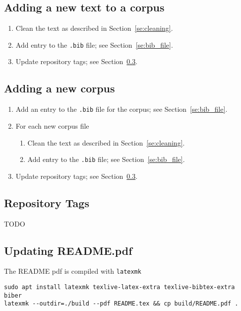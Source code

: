 \documentclass[a4paper,10pt]{paper}
\begin{document}
\subsection{Adding a new text to a corpus} \label{se:add_file}
\begin{enumerate}
    \item Clean the text as described in Section~\ref{se:cleaning}.
    \item Add entry to the \texttt{.bib} file; see Section~\ref{se:bib_file}. 
    \item Update repository tags; see Section~\ref{se:tags}.
\end{enumerate}

\subsection{Adding a new corpus}
\begin{enumerate}
    \item Add an entry to the \texttt{.bib} file for the corpus; see Section~\ref{se:bib_file}.
    \item For each new corpus file
        \begin{enumerate}
            \item Clean the text as described in Section~\ref{se:cleaning}.
            \item Add entry to the \texttt{.bib} file; see Section~\ref{se:bib_file}. 
        \end{enumerate}
    \item Update repository tags; see Section~\ref{se:tags}.
\end{enumerate}
\subsection{Repository Tags} \label{se:tags}
TODO

\subsection{Updating README.pdf} \label{se:update_readme}
The README pdf is compiled with \texttt{latexmk}
\begin{verbatim}
sudo apt install latexmk texlive-latex-extra texlive-bibtex-extra biber
latexmk --outdir=./build --pdf README.tex && cp build/README.pdf .
\end{verbatim}
\end{document}
